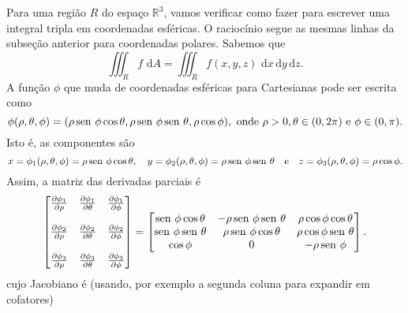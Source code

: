Para uma região $R$ do espaço $\mathbb{R}^3$, vamos verificar como fazer para escrever uma integral tripla em coordenadas esféricas. O raciocínio segue as mesmas linhas da subseção anterior para coordenadas polares. Sabemos que
\begin{equation}
\iiint_R f \, \, \mathrm{d} A = \iiint_R f(x,y, z) \, \, \mathrm{d} x \, \mathrm{d} y  \, \mathrm{d} z.
\end{equation} A função $\phi$ que muda de coordenadas esféricas para Cartesianas pode ser escrita como
\begin{equation}
\phi (\rho, \theta, \phi) = (\rho \operatorname{sen}\, \phi \cos \theta, \rho \operatorname{sen}\, \phi \operatorname{sen}\, \theta, \rho \cos \phi), \text{ onde } \rho> 0, \theta \in (0,2\pi) \text{ e } \phi \in (0, \pi).
\end{equation} Isto é, as componentes são
\begin{equation}
x = \phi_1 (\rho, \theta, \phi) = \rho \operatorname{sen}\, \phi \cos \theta, \quad
y = \phi_2 (\rho, \theta, \phi) = \rho \operatorname{sen}\, \phi \operatorname{sen}\, \theta \quad \text{e} \quad
z = \phi_3 (\rho, \theta, \phi) = \rho \cos \phi.
\end{equation} Assim, a matriz das derivadas parciais é
\begin{equation}
\begin{bmatrix}
\frac{\partial \phi_1}{\partial \rho} & \frac{\partial \phi_1}{\partial \theta} & \frac{\partial \phi_1}{\partial \phi}  \\
& & \\
\frac{\partial \phi_2}{\partial \rho} & \frac{\partial \phi_2}{\partial \theta} & \frac{\partial \phi_2}{\partial \phi} \\
& & \\
\frac{\partial \phi_3}{\partial \rho} & \frac{\partial \phi_3}{\partial \theta} & \frac{\partial \phi_3}{\partial \phi} \\
\end{bmatrix} =
\begin{bmatrix}
\operatorname{sen}\, \phi \cos \theta & -\rho \operatorname{sen}\, \phi \operatorname{sen}\, \theta   & \rho \cos \phi \cos \theta \\
\operatorname{sen}\, \phi \operatorname{sen}\, \theta &  \rho \operatorname{sen}\, \phi \cos \theta   & \rho \cos \phi \operatorname{sen}\, \theta  \\
\cos \phi         &            0                  &    -\rho \operatorname{sen}\, \phi  \\
\end{bmatrix}.
\end{equation} cujo Jacobiano é (usando, por exemplo a segunda coluna para expandir em cofatores)

